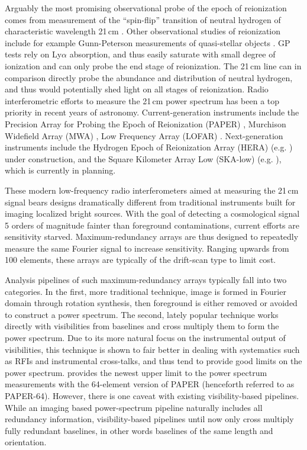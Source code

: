 \documentclass[twocolumn,apj,numberedappendix]{emulateapj}
\renewcommand\[{\begin{equation}}
\renewcommand\]{\end{equation}}
\begin{document}
Arguably the most promising observational probe of the epoch of reionization
comes from measurement of the ``spin-flip'' transition of neutral
hydrogen of characteristic wavelength 21\,cm \citep{Furlanetto2006181,PritchardLoeb}.
Other observational studies of reionization include for example Gunn-Peterson measurements of quasi-stellar objects \citep{Fan2006}. GP tests rely on Ly$\alpha$ absorption, and thus easily saturate with small degree of ionization and can only probe the end stage of reionization. The 21\,cm line can in comparison directly probe the
abundance and distribution of neutral hydrogen, and thus would potentially
shed light on all stages of reionization. Radio interferometric efforts
to measure the 21\,cm power spectrum has been a top priority in recent years of astronomy.
Current-generation instruments include the Precision Array for Probing
the Epoch of Reionization (PAPER) \citep{Ali2015,paper32}, Murchison
Widefield Array (MWA) \citep{Bowman2013, Tingay2013}, Low Frequency Array (LOFAR) \citep{LOFAR}. Next-generation instruments include the Hydrogen Epoch of Reionization
Array (HERA) (e.g. \citealt{HERA,HERAconfiguration,HERABEAM1,HERADISH2})  under construction, 
and the Square Kilometer Array Low (SKA-low) (e.g. \citealt{SKA1}), which is currently in planning. 

These modern low-frequency radio interferometers aimed at measuring the 21\,cm signal bears designs dramatically different from traditional instruments built for imaging localized bright sources.  With the goal of detecting a cosmological signal 5 orders of magnitude fainter than foreground contaminations, current efforts are sensitivity starved. Maximum-redundancy arrays are thus designed to repeatedly measure the same Fourier signal to increase sensitivity. Ranging upwards from 100 elements, these arrays are typically of the drift-scan type to limit cost. 

Analysis pipelines of such maximum-redundancy arrays typically fall into two categories. In the first, more traditional technique, image is formed in Fourier domain through rotation synthesis, then foreground is either removed or avoided to construct a power spectrum. The second, lately popular technique works directly with visibilities from baselines and cross multiply them to form the power spectrum. Due to its more natural focus on the instrumental output of visibilities, this technique is shown to fair better in dealing with systematics such as RFIs and instrumental cross-talks, and thus tend to provide good limits on the power spectrum. \cite{Ali2015} provides the newest upper limit to the power spectrum
measurements with the 64-element version of PAPER (henceforth referred to as PAPER-64). However, there is one caveat with existing visibility-based pipelines. While an imaging based power-spectrum pipeline naturally includes all redundancy information, visibility-based pipelines until now only cross multiply fully redundant baselines, in other words baselines of the same length and orientation.
\end{document}
